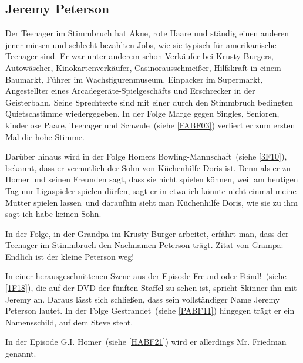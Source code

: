 {\subsection{Jeremy Peterson}\label{JeremyPeterson} 
Der Teenager im Stimmbruch hat Akne, rote Haare und ständig einen anderen jener miesen und schlecht bezahlten Jobs, wie sie typisch für amerikanische Teenager sind. Er war unter anderem schon Verkäufer bei Krusty Burgers, Autowäscher, Kinokartenverkäufer, Casinorausschmeißer, Hilfskraft in einem Baumarkt, Führer im Wachsfigurenmuseum, Einpacker im Supermarkt, Angestellter eines Arcadegeräte-Spielgeschäfts und Erschrecker in der Geisterbahn. Seine Sprechtexte sind mit einer durch den Stimmbruch bedingten Quietschstimme wiedergegeben. In der Folge \glqq Marge gegen Singles, Senioren, kinderlose Paare, Teenager und Schwule\grqq\ (siehe \ref{FABF03}) verliert er zum ersten Mal die hohe Stimme.

Darüber hinaus wird in der Folge \glqq Homers Bowling-Mannschaft\grqq\ (siehe \ref{3F10}), bekannt, dass er vermutlich der Sohn von Küchenhilfe Doris ist. Denn als er zu Homer und seinen Freunden sagt, dass sie nicht spielen können, weil am heutigen Tag nur Ligaspieler spielen dürfen, sagt er in etwa \glqq ich könnte nicht einmal meine Mutter spielen lassen\grqq\ und daraufhin sieht man Küchenhilfe Doris, wie sie zu ihm sagt \glqq ich habe keinen Sohn\grqq .

In der Folge, in der Grandpa im Krusty Burger arbeitet, erfährt man, dass der Teenager im Stimmbruch den Nachnamen Peterson trägt. Zitat von Grampa: \glqq Endlich ist der kleine Peterson weg!\grqq

In einer herausgeschnittenen Szene aus der Episode \glqq Freund oder Feind!\grqq\ (siehe \ref{1F18}), die auf der DVD der fünften Staffel zu sehen ist, spricht Skinner ihn mit Jeremy an. Daraus lässt sich schließen, dass sein vollständiger Name Jeremy Peterson lautet. In der Folge \glqq Gestrandet\grqq\ (siehe \ref{PABF11}) hingegen trägt er ein Namensschild, auf dem Steve steht.

In der Episode \glqq G.I. Homer\grqq\ (siehe \ref{HABF21}) wird er allerdings Mr. Friedman genannt.

}
